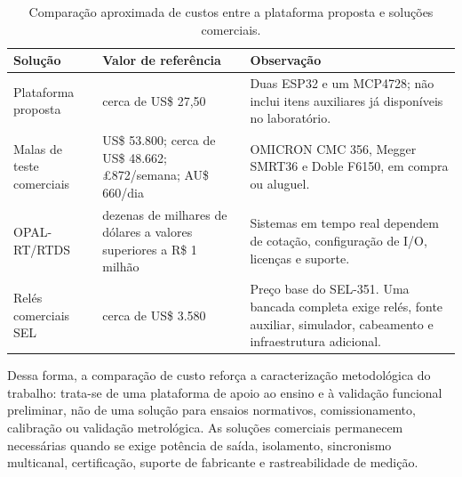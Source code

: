 \begin{table}[H]
  \centering
  \small
  \caption{Comparação aproximada de custos entre a plataforma proposta e soluções comerciais.}
  \label{tab:comparacao-custos}
  \begin{tabular}{>{\raggedright\arraybackslash}p{3.4cm}
                  >{\raggedright\arraybackslash}p{3.1cm}
                  >{\raggedright\arraybackslash}p{5.7cm}}
    \toprule
    Solução & Valor de referência & Observação \\
    \midrule

    Plataforma proposta &
    cerca de US\$ 27,50 &
    Duas ESP32 e um MCP4728; não inclui itens auxiliares já disponíveis no laboratório. \\

    Malas de teste comerciais &
    US\$ 53.800; cerca de US\$ 48.662; £872/semana; AU\$ 660/dia &
    OMICRON CMC 356, Megger SMRT36 e Doble F6150, em compra ou aluguel. \\

    OPAL-RT/RTDS &
    dezenas de milhares de dólares a valores superiores a R\$ 1 milhão &
    Sistemas em tempo real dependem de cotação, configuração de I/O, licenças e suporte. \\

    Relés comerciais SEL &
    cerca de US\$ 3.580 &
    Preço base do SEL-351. Uma bancada completa exige relés, fonte auxiliar, simulador, cabeamento e infraestrutura adicional. \\

    \bottomrule
  \end{tabular}
\end{table}

Dessa forma, a comparação de custo reforça a caracterização metodológica do trabalho: trata-se de uma plataforma de apoio ao ensino e à validação funcional preliminar, não de uma solução para ensaios normativos, comissionamento, calibração ou validação metrológica. As soluções comerciais permanecem necessárias quando se exige potência de saída, isolamento, sincronismo multicanal, certificação, suporte de fabricante e rastreabilidade de medição.

